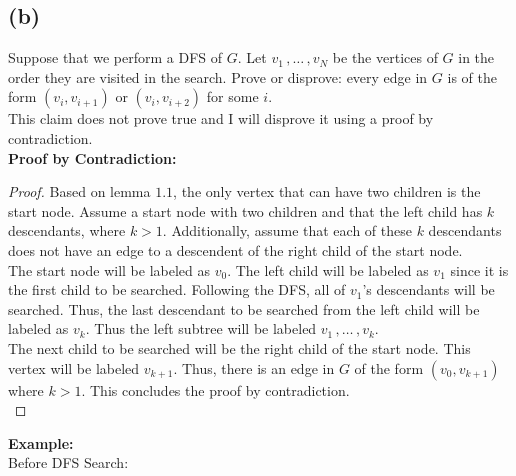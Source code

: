 \documentclass{article}
\theoremstyle{definition}
\theoremstyle{remark}
\theoremstyle{plain}
\begin{document}
\subsection{(b)}

Suppose that we perform a DFS of $G$. Let $v_1\,, \dots \,,v_N$ be the vertices of $G$ in the order they are visited in the search. Prove or disprove: every edge in $G$ is of the form $(v_i, v_{i+1})$ or $(v_i, v_{i+2})$ for some $i$.\\

This claim does not prove true and I will disprove it using a proof by contradiction.\\

\textbf{Proof by Contradiction:}\\

\begin{proof}

Based on lemma $1.1$, the only vertex that can have two children is the start node. Assume a start node with two children and that the left child has $k$ descendants, where $k > 1$. Additionally, assume that each of these $k$ descendants does not have an edge to a descendent of the right child of the start node. \\

The start node will be labeled as $v_0$. The left child will be labeled as $v_1$ since it is the first child to be searched. Following the DFS, all of $v_1$'s descendants will be searched. Thus, the last descendant to be searched from the left child will be labeled as $v_k$. Thus the left subtree will be labeled $v_1 \,, \dots \,, v_k$. \\

The next child to be searched will be the right child of the start node. This vertex will be labeled $v_{k+1}$. Thus, there is an edge in $G$ of the form $(v_0, v_{k+1})$ where $k > 1$. This concludes the proof by contradiction.\\

\end{proof}

\textbf{Example:}\\

Before DFS Search:\\

\\
\end{document}
